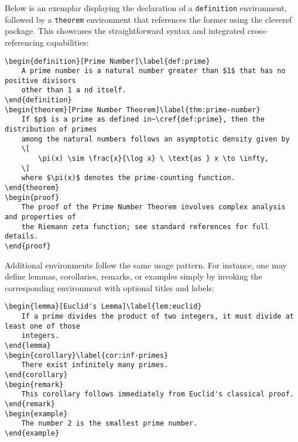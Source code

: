 \documentclass[10pt,letterpaper]{amsart}
\begin{document}
Below is an exemplar displaying the declaration of a \texttt{definition}
environment, followed by a \texttt{theorem} environment that references the
former using the \textsf{cleveref} package. This showcases the straightforward
syntax and integrated cross-referencing capabilities:

\begin{verbatim}
\begin{definition}[Prime Number]\label{def:prime}
    A prime number is a natural number greater than $1$ that has no positive divisors
    other than 1 a nd itself.
\end{definition}
\begin{theorem}[Prime Number Theorem]\label{thm:prime-number}
    If $p$ is a prime as defined in~\cref{def:prime}, then the distribution of primes
    among the natural numbers follows an asymptotic density given by
    \[
        \pi(x) \sim \frac{x}{\log x} \ \text{as } x \to \infty,
    \]
    where $\pi(x)$ denotes the prime-counting function.
\end{theorem}
\begin{proof}
    The proof of the Prime Number Theorem involves complex analysis and properties of 
    the Riemann zeta function; see standard references for full details.
\end{proof}
\end{verbatim}

Additional environments follow the same usage pattern. For instance, one may
define lemmas, corollaries, remarks, or examples simply by invoking the
corresponding environment with optional titles and labels:

\begin{verbatim}
\begin{lemma}[Euclid's Lemma]\label{lem:euclid}
    If a prime divides the product of two integers, it must divide at least one of those
    integers.
\end{lemma}
\begin{corollary}\label{cor:inf-primes}
    There exist infinitely many primes.
\end{corollary}
\begin{remark}
    This corollary follows immediately from Euclid's classical proof.
\end{remark}
\begin{example}
    The number 2 is the smallest prime number.
\end{example}
\end{verbatim}
\end{document}
